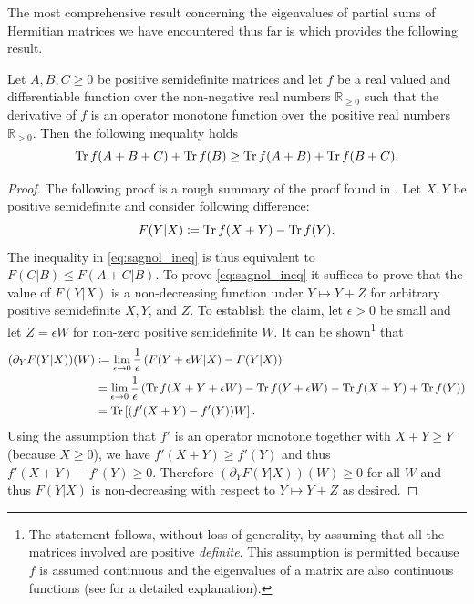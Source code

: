 \documentclass[notitlepage, 10pt]{article}
\begin{document}
The most comprehensive result concerning the eigenvalues of partial sums of Hermitian matrices we have encountered thus far is \cite[Proposition 2.3]{sagnol2013approximation} which provides the following result.
\begin{thm}
    \label{thm:sagnol_ineq}
    Let $A,B,C \geq 0$ be positive semidefinite matrices and let $f$ be a real valued and differentiable function over the non-negative real numbers $\mathbb R_{\geq 0}$ such that the derivative of $f$ is an operator monotone function over the positive real numbers $\mathbb R_{>0}$.
    Then the following inequality holds
    \begin{equation}
        \label{eq:sagnol_ineq}
        \operatorname{Tr} f(A+B+C) 
        +
        \operatorname{Tr} f(B)
        \geq
        \operatorname{Tr} f(A+B)
        +
        \operatorname{Tr} f(B+C).
    \end{equation}
\end{thm}
\begin{proof}
    The following proof is a rough summary of the proof found in \cite[Section 2.1]{sagnol2013approximation}.
    Let $X,Y$ be positive semidefinite and consider following difference:
    \begin{equation}
        F(Y|X) \coloneqq \operatorname{Tr} f (X+Y) - \operatorname{Tr} f(Y).
    \end{equation}
    The inequality in \cref{eq:sagnol_ineq} is thus equivalent to $F(C|B) \leq F(A+C|B)$.
    To prove \cref{eq:sagnol_ineq} it suffices to prove that the value of $F(Y|X)$ is a non-decreasing function under $Y \mapsto Y+Z$ for arbitrary positive semidefinite $X,Y$, and $Z$.
    To establish the claim, let $\epsilon > 0$ be small and let $Z = \epsilon W$ for non-zero positive semidefinite $W$.
    It can be shown\footnote{The statement follows, without loss of generality, by assuming that all the matrices involved are positive \textit{definite}. This assumption is permitted because $f$ is assumed continuous and the eigenvalues of a matrix are also continuous functions (see \cite{sagnol2013approximation} for a detailed explanation).} that
    \begin{align}
        (\partial_{Y}F(Y|X))(W)
        &\coloneqq\lim_{\epsilon \to 0} \frac{1}{\epsilon} \left( F(Y+\epsilon W|X) - F(Y|X) \right) \\
        &= \lim_{\epsilon \to 0} \frac{1}{\epsilon} \left( \operatorname{Tr} f(X+Y+\epsilon W) - \operatorname{Tr} f(Y+\epsilon W) - \operatorname{Tr} f(X+Y) + \operatorname{Tr} f(Y) \right) \\
        &= \operatorname{Tr}\left[(f'(X+Y)-f'(Y)) W \right].
    \end{align}
    Using the assumption that $f'$ is an operator monotone together with $X+Y \geq Y$ (because $X \geq 0$), we have $f'(X+Y) \geq f'(Y)$ and thus $f'(X+Y)-f'(Y) \geq 0$.
    Therefore $(\partial_{Y}F(Y|X))(W) \geq 0$ for all $W$ and thus $F(Y|X)$ is non-decreasing with respect to $Y \mapsto Y+Z$ as desired.
\end{proof}
\end{document}
